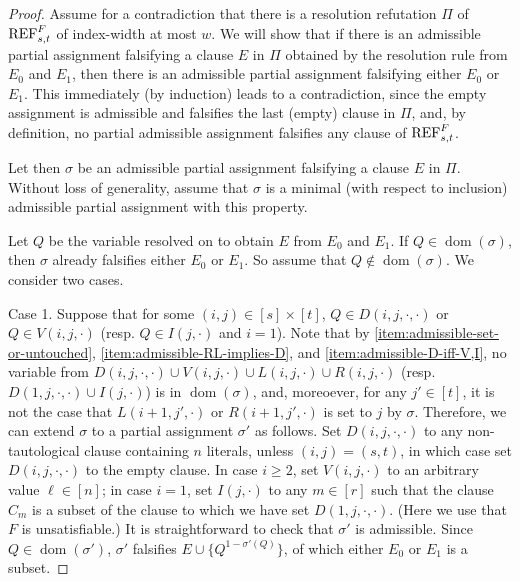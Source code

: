 \documentclass[10pt,a4paper]{article}
\theoremstyle{remark}
\newtheorem*{switching lemma}{Switching Lemma}
\newtheorem*{open problem}{Open Problem}
\theoremstyle{definition}
\DeclareMathOperator{\dom}{dom}
\begin{document}
\begin{proof}
Assume for a contradiction that there is a resolution refutation $\Pi$ of $\textnormal{REF}^{F}_{s,t}$ of index-width at most $w$. We will show that if there is an admissible partial assignment falsifying a clause $E$ in $\Pi$ obtained by the resolution rule from $E_0$ and $E_1$, then there is an admissible partial assignment falsifying either $E_0$ or $E_1$. This immediately (by induction) leads to a contradiction, since the empty assignment is admissible and falsifies the last (empty) clause in $\Pi$, and, by definition, no partial admissible assignment falsifies any clause of $\textnormal{REF}^{F}_{s,t}$.

Let then $\sigma$ be an admissible partial assignment falsifying a clause $E$ in $\Pi$. Without loss of generality, assume that $\sigma$ is a minimal (with respect to inclusion) admissible partial assignment with this property. 

Let $Q$ be the variable resolved on to obtain $E$ from $E_0$ and $E_1$. If $Q \in \dom(\sigma)$, then $\sigma$ already falsifies either $E_0$ or $E_1$. So assume that $Q \not \in \dom(\sigma)$.
We consider two cases.

Case 1. Suppose that for some $(i,j) \in [s] \times [t]$, $Q \in D(i,j,\cdot, \cdot)$ or $Q \in V(i,j,\cdot)$ (resp. $Q \in I(j,\cdot)$ and $i = 1$). Note that by \ref{item:admissible-set-or-untouched}, \ref{item:admissible-RL-implies-D}, and \ref{item:admissible-D-iff-V,I}, no variable from $D(i,j,\cdot, \cdot) \cup V(i,j,\cdot) \cup L(i,j,\cdot) \cup R(i,j,\cdot)$ (resp. $D(1,j,\cdot, \cdot) \cup I(j,\cdot)$) is in $\dom(\sigma)$, and, moreoever, for any $j' \in [t]$, it is not the case that $L(i+1,j',\cdot)$ or $R(i+1,j',\cdot)$ is set to $j$ by $\sigma$. Therefore, we can extend $\sigma$ to a partial assignment $\sigma'$ as follows. Set $D(i,j,\cdot, \cdot)$ to any non-tautological clause containing $n$ literals, unless $(i,j) = (s,t)$, in which case set $D(i,j,\cdot, \cdot)$ to the empty clause. In case $i \geq 2$, set $V(i,j,\cdot)$ to an arbitrary value $\ell \in [n]$; in case $i=1$, set $I(j,\cdot)$ to any $m \in [r]$ such that the clause $C_m$ is a subset of the clause to which we have set $D(1,j,\cdot, \cdot)$. (Here we use that $F$ is unsatisfiable.) It is straightforward to check that $\sigma'$ is admissible. Since $Q \in \dom(\sigma')$, $\sigma'$ falsifies $E \cup \{Q^{1-\sigma'(Q)}\}$, of which either $E_0$ or $E_1$ is a subset.   


\end{proof}
\end{document}
